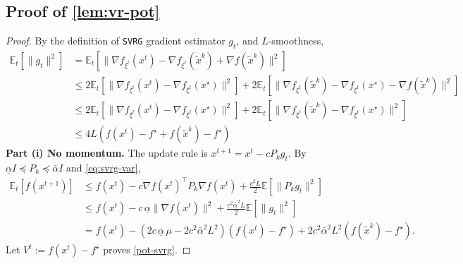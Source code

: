\documentclass{article}
\theoremstyle{definition}
\newcommand{\assign}{:=}
\newcommand{\svrg}{\texttt{SVRG}}
\begin{document}
\subsection{Proof of \cref{lem:vr-pot}}
\begin{proof}
  By the definition of {\svrg} gradient estimator $g_t$, and $L$-smoothness,
  \begin{align}
    \mathbb{E}_t [\| g_t \|^2] &{}= \mathbb{E}_t [\| \nabla f_{\xi^t} (x^t) -
    \nabla f_{\xi^t} (\tilde{x}^k) + \nabla f (\tilde{x}^k) \|^2] \nonumber\\
    &{}\leq 2\mathbb{E}_t [\| \nabla f_{\xi^t} (x^t) - \nabla f_{\xi^t}
    (x^{\star}) \|^2] + 2\mathbb{E}_t [\| \nabla f_{\xi^t} (\tilde{x}^k) -
    \nabla f_{\xi^t} (x^{\star}) - \nabla f (\tilde{x}^k) \|^2] \nonumber\\
    &{}\leq 2\mathbb{E}_t [\| \nabla f_{\xi^t} (x^t) - \nabla f_{\xi^t}
    (x^{\star}) \|^2] + 2\mathbb{E}_t [\| \nabla f_{\xi^t} (\tilde{x}^k) -
    \nabla f_{\xi^t} (x^{\star}) \|^2] \nonumber\\
    &{}\leq 4 L (f (x^t) - f^{\star} + f (\tilde{x}^k) - f^{\star}) 
    \label{eq:svrg-var}
  \end{align}
  \textbf{Part (i) No momentum.} The update rule is $x^{t + 1} = x^t - c P_k
  g_t$. By $\underline{\alpha} I \preceq P_k \preceq \bar{\alpha} I$ and
  \eqref{eq:svrg-var},
  \begin{align*}
    \mathbb{E}_t [f (x^{t + 1})] &{}\leq f (x^t) - c \nabla f (x^t)^{\top}
    P_k \nabla f (x^t) + \tfrac{c^2 L}{2} \mathbb{E} [\| P_k g_t \|^2]\\
    &{}\leq f (x^t) - c \, \underline{\alpha}  \| \nabla f (x^t) \|^2 +
    \tfrac{c^2 \bar{\alpha}^2 L}{2} \mathbb{E} [\| g_t \|^2]\\
    &{}= f (x^t) - \left( 2 c \, \underline{\alpha} \,  \mu - 2 c^2 \bar{\alpha}^2
    L^2 \right) (f (x^t) - f^{\star}) + 2 c^2 \bar{\alpha}^2 L^2 (f
    (\tilde{x}^k) - f^{\star}) .
  \end{align*}
  Let $V^t \assign f (x^t) - f^{\star}$ proves \eqref{pot-svrg}.


\end{proof}
\end{document}

